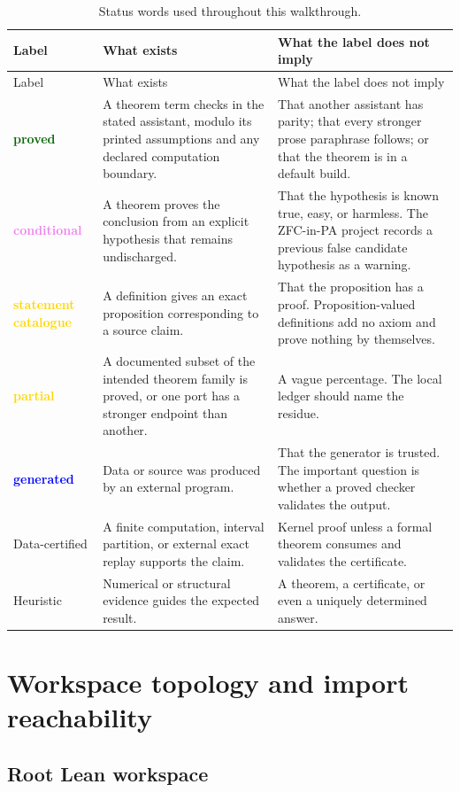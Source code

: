\documentclass[
  10pt,
  a4paper,
  twoside,
  open=any,
  parskip=half,
  headings=big
]{scrreprt}
\newcommand{\yes}{\textcolor{darkgreen}{\textbf{proved}}}
\newcommand{\partialstatus}{\textcolor{gold}{\textbf{partial}}}
\newcommand{\conditional}{\textcolor{violet}{\textbf{conditional}}}
\newcommand{\generated}{\textcolor{blue}{\textbf{generated}}}
\newcommand{\statementonly}{\textcolor{gold}{\textbf{statement catalogue}}}
\begin{document}
\begin{longtable}{@{}L{28mm}L{45mm}L{82mm}@{}}
\caption{Status words used throughout this walkthrough.}\label{tab:status-vocabulary}\\
\toprule
Label & What exists & What the label does not imply \\
\midrule
\endfirsthead
\toprule
Label & What exists & What the label does not imply \\
\midrule
\endhead
\bottomrule
\endfoot
\yes & A theorem term checks in the stated assistant, modulo its printed assumptions and any declared computation boundary. & That another assistant has parity; that every stronger prose paraphrase follows; or that the theorem is in a default build. \\
\conditional & A theorem proves the conclusion from an explicit hypothesis that remains undischarged. & That the hypothesis is known true, easy, or harmless. The ZFC-in-PA project records a previous false candidate hypothesis as a warning. \\
\statementonly & A definition gives an exact proposition corresponding to a source claim. & That the proposition has a proof. Proposition-valued definitions add no axiom and prove nothing by themselves. \\
\partialstatus & A documented subset of the intended theorem family is proved, or one port has a stronger endpoint than another. & A vague percentage. The local ledger should name the residue. \\
\generated & Data or source was produced by an external program. & That the generator is trusted. The important question is whether a proved checker validates the output. \\
Data-certified & A finite computation, interval partition, or external exact replay supports the claim. & Kernel proof unless a formal theorem consumes and validates the certificate. \\
Heuristic & Numerical or structural evidence guides the expected result. & A theorem, a certificate, or even a uniquely determined answer. \\
\end{longtable}

\chapter{Workspace topology and import reachability}
\label{ch:workspace}

\section{Root Lean workspace}
\end{document}
